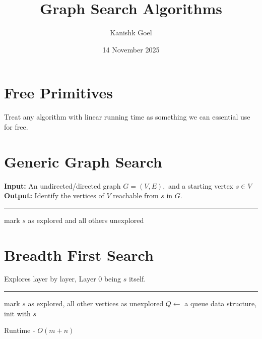 \documentclass{article}
\title{Graph Search Algorithms}
\author{Kanishk Goel}
\date{14 November 2025}
\begin{document}
	\SetAlgoCaptionSeparator{}
	\renewcommand{\thealgocf}{} 
	\renewcommand{\AlCapNameFnt}{\bfseries}
	\renewcommand{\AlCapFnt}{}
	\DontPrintSemicolon
	\renewcommand{\algorithmcfname}{}
	\maketitle
	\tableofcontents
	\SetAlgoNoEnd
	
	\newpage 
	
	\section{Free Primitives}
	Treat any algorithm with linear running time as something we can essential use for free.
	
	\section{Generic Graph Search}
	\textbf{Input:} An undirected/directed graph $G = (V,E),$ and a starting vertex $s \in V$ \\
	\textbf{Output:} Identify the vertices of $V$ reachable from $s$ in $G$. \\
	
	\begin{algorithm}[H]
		\SetAlgoLined
		\caption{Generic Graph Search}
		\BlankLine
		\hrule
		\BlankLine
		mark $s$ as explored and all others unexplored \;
	\end{algorithm}
	
	\section{Breadth First Search} 
	Explores layer by layer, Layer $0$ being $s$ itself.
	
	\begin{algorithm}[H]
		\SetAlgoLined
		\caption{Breadth First Search (BFS)}
		\BlankLine
		\hrule
		\BlankLine
		mark $s$ as explored, all other vertices as unexplored \;
		$Q \leftarrow$ a queue data structure, init with $s$ \;
	\end{algorithm} 
	Runtime - $O(m+n)$
	
\end{document}
